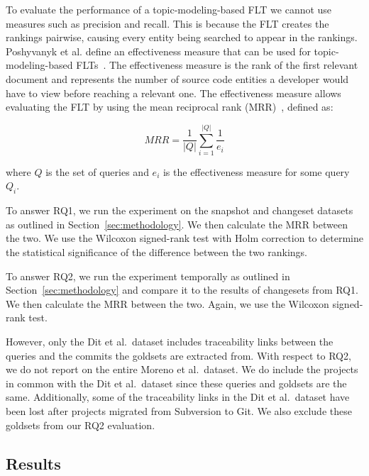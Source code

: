 To evaluate the performance of a topic-modeling-based FLT we cannot use
measures such as precision and recall. This is because the FLT creates
the rankings pairwise, causing every entity being searched to appear in the rankings.
Poshyvanyk et al. define an effectiveness measure that can be used for topic-modeling-based FLTs~\cite{Poshyvanyk-etal:2007}.
The effectiveness measure is the rank of the first relevant document
and represents the number of source code entities a developer would have to view before reaching a relevant one.
The effectiveness measure allows evaluating the FLT by using
the mean reciprocal rank (MRR)~\cite{Voorhees:1999}, defined as:

\begin{equation}
    MRR = \frac{1}{|Q|} \sum_{i=1}^{|Q|} \frac{1}{e_i}
\end{equation}

where $Q$ is the set of queries
and $e_i$ is the effectiveness measure for some query $Q_i$.

To answer RQ1, we run the experiment on the snapshot and changeset
datasets as outlined in Section~\ref{sec:methodology}.
We then calculate the MRR between the two.
We use the Wilcoxon signed-rank test with Holm correction to determine
the statistical significance of the difference between the two rankings.

To answer RQ2, we run the experiment temporally as outlined in Section~\ref{sec:methodology}
and compare it to the results of changesets from RQ1.
We then calculate the MRR between the two.
Again, we use the Wilcoxon signed-rank test.

However, only the Dit et al.\ dataset includes traceability links between
the queries and the commits the goldsets are extracted from.
With respect to RQ2, we do not report on the entire Moreno et al.\ dataset.
We do include the projects in common with the Dit et al.\ dataset
since these queries and goldsets are the same.
Additionally, some of the traceability links in the Dit et al.\ dataset
have been lost after projects migrated from Subversion to Git.
We also exclude these goldsets from our RQ2 evaluation.



\subsection{Results}




